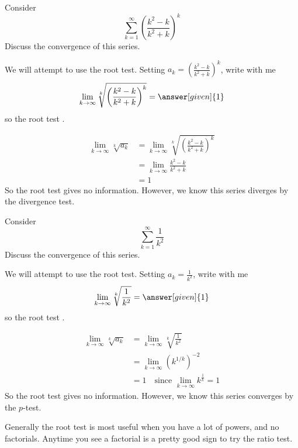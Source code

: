 \documentclass{ximera}
\begin{document}
\begin{example}
  Consider 
  \[
  \sum_{k=1}^\infty \left(\frac{k^2-k}{k^2+k}\right)^k
  \]
  Discuss the convergence of this series.
  \begin{explanation}
    We will attempt to use the root test. Setting
    $a_k=\left(\frac{k^2-k}{k^2+k}\right)^k$, write with me
    \[
    \lim_{k \to \infty} \sqrt[k]{\left(\frac{k^2-k}{k^2+k}\right)^k} = \answer[given]{1}	
    \]
    so the root test
	  .		
	  \begin{hint}
            \begin{align*}
	      \lim_{k \to \infty} \sqrt[k]{a_k} &= \lim_{k \to \infty} \sqrt[k]{\left(\frac{k^2-k}{k^2+k}\right)^k}\\
	      &=\lim_{k \to \infty}\frac{k^2-k}{k^2+k}\\
	      &=1
	    \end{align*}
	    So the root test gives no information.  However, we know this series diverges by the divergence test.
	  \end{hint}
  \end{explanation}
\end{example}


\begin{example}
  Consider 
  \[
  \sum_{k=1}^\infty \frac{1}{k^2}
  \]
  Discuss the convergence of this series.
  \begin{explanation}
    We will attempt to use the root test. Setting
    $a_k=\frac{1}{k^2}$, write with me
    \[
    \lim_{k \to \infty} \sqrt[k]{\frac{1}{k^2}} = \answer[given]{1}	
    \]
    so the root test
	  .		
	  \begin{hint}
            \begin{align*}
	      \lim_{k \to \infty} \sqrt[k]{a_k} &= \lim_{k \to \infty} \sqrt[k]{\frac{1}{k^2}}\\
	      &=\lim_{k \to \infty}\left(k^{1/k}\right)^{-2}\\
	      &=1 \quad\text{since $\lim_{k \to \infty} k^\frac{1}{k} = 1$}
	    \end{align*}
	    So the root test gives no information.  However, we know
            this series converges by the $p$-test.
	  \end{hint}
  \end{explanation}
\end{example}

Generally the root test is most useful when you have a lot of powers,
and no factorials.  Anytime you see a factorial is a pretty good sign
to try the ratio test.
\end{document}
